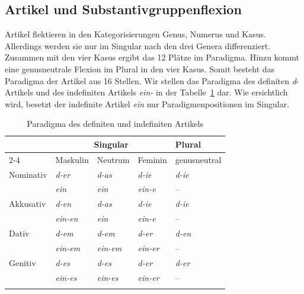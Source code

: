  
\subsection{Artikel und Substantivgruppenflexion}\label{subsection:Artikel_SGr_Flexion}

Artikel flektieren in den Kategorisierungen Genus, Numerus und Kasus. Allerdings werden sie nur im Singular nach den drei Genera differenziert. Zusammen mit den vier Kasus ergibt das 12 Plätze im Paradigma. Hinzu kommt eine genusneutrale Flexion im Plural in den vier Kasus. Somit besteht das Paradigma der Artikel aus 16 Stellen. Wir stellen das Paradigma des definiten \textit{d}-Artikels und des indefiniten Artikels \textit{ein-} in der Tabelle~\ref{tab:def_Art} dar. Wie ersichtlich wird, besetzt der indefinite Artikel \textit{ein} nur Paradigmenpositionen im Singular.

\begin{table}[t]
  \centering
  \begin{tabular}{l l l l l}
    \lsptoprule
     & \multicolumn{3}{c}{Singular} & Plural \\
     \cmidrule{2-4}
    & Maskulin & Neutrum & Feminin & genusneutral\\   
    \hline
    Nominativ & \textit{d-er} & \textit{d-as} & \textit{d-ie} & \textit{d-ie} \\

    & \textit{ein} & \textit{ein} & \textit{ein-e} & – \\
    
    Akkusativ & \textit{d-en} & \textit{d-as} & \textit{d-ie} & \textit{d-ie} \\

    & \textit{ein-en} & \textit{ein} & \textit{ein-e} & – \\
    
    Dativ & \textit{d-em} & \textit{d-em} & \textit{d-er} & \textit{d-en} \\

    & \textit{ein-em} & \textit{ein-em} & \textit{ein-er} & – \\
    
    Genitiv & \textit{d-es} & \textit{d-es} & \textit{d-er} & \textit{d-er} \\

    & \textit{ein-es} & \textit{ein-es} & \textit{ein-er} & – \\   
    \lspbottomrule 
  \end{tabular}
  \caption{Paradigma des definiten und indefiniten Artikels}
  \label{tab:def_Art}
\end{table}

